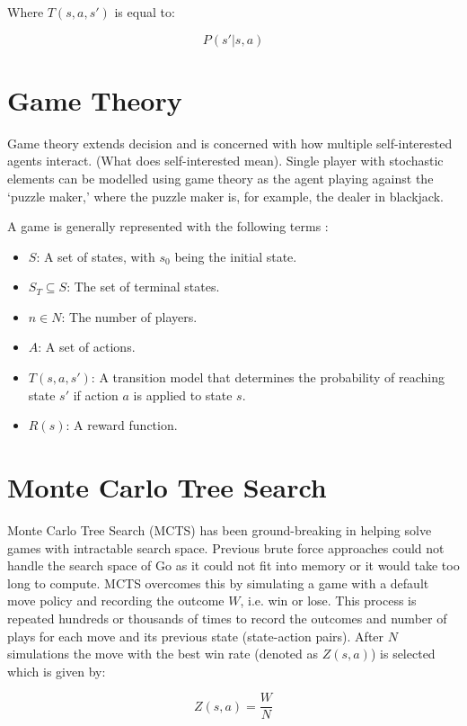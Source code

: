 \documentclass{bhamthesis}
\theoremstyle{definition}
\begin{document}
Where $T(s,a,s')$ is equal to:

\begin{equation}\label{mdp}
P(s' | s,a)
\end{equation}

\section{Game Theory}
Game theory extends decision and is concerned with how multiple self-interested agents interact. (What does self-interested mean). Single player with stochastic elements can be modelled using game theory as the agent playing against the `puzzle maker,' where the puzzle maker is, for example, the dealer in blackjack.

A game is generally represented with the following terms \cite{Browne2012}:

\begin{itemize}
	\item $S$: A set of states, with $s_0$ being the initial state.
	\item $S_T \subseteq S$: The set of terminal states.
	\item $n \in N$: The number of players.
	\item $A$: A set of actions.
	\item $T(s,a,s')$: A transition model that determines the probability of reaching state $s'$ if action $a$ is applied to state $s$.
	\item $R(s)$: A reward function.
\end{itemize}



\section{Monte Carlo Tree Search}
Monte Carlo Tree Search (MCTS) has been ground-breaking in helping solve games with intractable search space. Previous brute force approaches could not handle the search space of Go as it could not fit into memory or it would take too long to compute. MCTS overcomes this by simulating a game with a default move policy and recording the outcome $W$, i.e. win or lose. This process is repeated hundreds or thousands of times to record the outcomes and number of plays for each move and its previous state (state-action pairs). After $N$ simulations the move with the best win rate (denoted as $Z(s,a)$) is selected which is given by:

\begin{equation}\label{utility}
Z(s,a) = \frac{W}{N}
\end{equation} 
\end{document}
